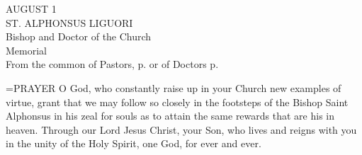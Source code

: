 \begin{center}\normalsize AUGUST 1\\
\footnotesize ST. ALPHONSUS LIGUORI\\
\footnotesize Bishop and Doctor of the Church\\
\footnotesize Memorial\\
\footnotesize From the common of Pastors, p.     or of Doctors p. \\
\end{center}

\hangindent=\parindent \small{PRAYER 
O God, who constantly raise up in your Church new examples of virtue,
grant that we may follow so closely in the footsteps
of the Bishop Saint Alphonsus in his zeal for souls
as to attain the same rewards that are his in heaven.
Through our Lord Jesus Christ, your Son,
who lives and reigns with you in the unity of the Holy Spirit,
one God, for ever and ever.\\}
 
